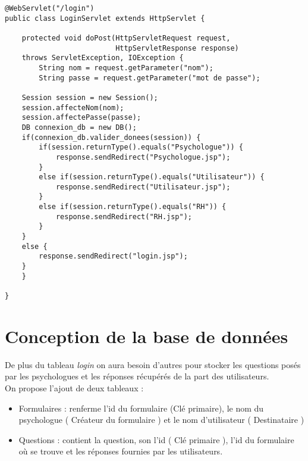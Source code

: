 \documentclass[12]{article}
\begin{document}
\lstset{language=java}
\begin{lstlisting}
@WebServlet("/login")
public class LoginServlet extends HttpServlet {
	
	protected void doPost(HttpServletRequest request, 
						  HttpServletResponse response) 
	throws ServletException, IOException {
		String nom = request.getParameter("nom");
		String passe = request.getParameter("mot de passe");
		
	Session session = new Session();
	session.affecteNom(nom);
	session.affectePasse(passe);
	DB connexion_db = new DB();
	if(connexion_db.valider_donees(session)) {
		if(session.returnType().equals("Psychologue")) {
			response.sendRedirect("Psychologue.jsp");
		}
		else if(session.returnType().equals("Utilisateur")) {
			response.sendRedirect("Utilisateur.jsp");
		}
		else if(session.returnType().equals("RH")) {
			response.sendRedirect("RH.jsp");
		}
	}
	else {
		response.sendRedirect("login.jsp");
	}
	}

}
\end{lstlisting}



\section{Conception de la base de données}

De plus du tableau \textit{login} on aura besoin d'autres pour stocker les questions posés par les psychologues et les réponses récupérés de la part des utilisateurs.\\
On propose l'ajout de deux tableaux :\\
\begin{itemize}
\item Formulaires : renferme l'id du formulaire (Clé primaire), le nom du psychologue ( Créateur du formulaire ) et le nom d'utilisateur ( Destinataire )\\
\item Questions : contient la question, son l'id ( Clé primaire ), l'id du formulaire où se trouve et les réponses fournies par les utilisateurs.
\end{itemize}
\end{document}
